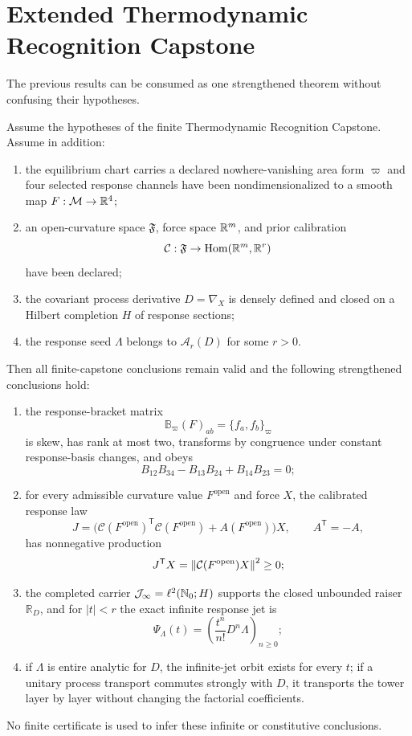 \section{Extended Thermodynamic Recognition Capstone}
\label{sec:extended-capstone}

The previous results can be consumed as one strengthened theorem without confusing their hypotheses.

\begin{theorem}
Assume the hypotheses of the finite Thermodynamic Recognition Capstone.  Assume in addition:
\begin{enumerate}[label=(\roman*)]
\item the equilibrium chart carries a declared nowhere-vanishing area form $\varpi$ and four selected response channels have been nondimensionalized to a smooth map $F:\mathcal M\to\mathbb R^4$;
\item an open-curvature space $\mathfrak F$, force space $\mathbb R^m$, and prior calibration
\[
\mathcal C:\mathfrak F\to\operatorname{Hom}(\mathbb R^m,\mathbb R^r)
\]
have been declared;
\item the covariant process derivative $D=\nabla_X$ is densely defined and closed on a Hilbert completion $H$ of response sections;
\item the response seed $\Lambda$ belongs to $\mathcal A_r(D)$ for some $r>0$.
\end{enumerate}
Then all finite-capstone conclusions remain valid and the following strengthened conclusions hold:
\begin{enumerate}[label=(\alph*)]
\item the response-bracket matrix
\[
\mathbb B_\varpi(F)_{ab}=\{f_a,f_b\}_\varpi
\]
is skew, has rank at most two, transforms by congruence under constant response-basis changes, and obeys
\[
B_{12}B_{34}-B_{13}B_{24}+B_{14}B_{23}=0;
\]
\item for every admissible curvature value $F^{\mathrm{open}}$ and force $X$, the calibrated response law
\[
J=\bigl(\mathcal C(F^{\mathrm{open}})^{\mathsf T}
\mathcal C(F^{\mathrm{open}})+A(F^{\mathrm{open}})\bigr)X,
\qquad A^{\mathsf T}=-A,
\]
has nonnegative production
\[
J^{\mathsf T}X
=\left\lVert\mathcal C(F^{\mathrm{open}})X\right\rVert^2\ge0;
\]
\item the completed carrier $\mathcal J_\infty=\ell^2(\mathbb N_0;H)$ supports the closed unbounded raiser $\mathbb R_D$, and for $|t|<r$ the exact infinite response jet is
\[
\Psi_\Lambda(t)
=\left(\frac{t^n}{n!}D^n\Lambda\right)_{n\ge0};
\]
\item if $\Lambda$ is entire analytic for $D$, the infinite-jet orbit exists for every $t$; if a unitary process transport commutes strongly with $D$, it transports the tower layer by layer without changing the factorial coefficients.
\end{enumerate}
No finite certificate is used to infer these infinite or constitutive conclusions.
\end{theorem}

